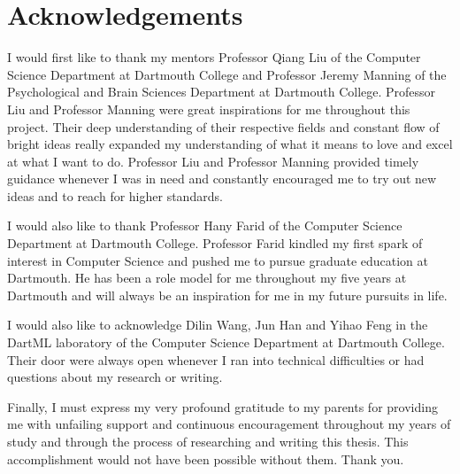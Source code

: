 \documentclass[12pt]{article}
\makeatletter
\renewcommand\listoffigures{%
    \section{\listfigurename}%
      \@mkboth{\MakeUppercase\listfigurename}%
              {\MakeUppercase\listfigurename}%
    \@starttoc{lof}%
    }
\makeatother
\begin{document}
\section{Acknowledgements}
I would first like to thank my mentors Professor Qiang Liu of the Computer Science Department at Dartmouth College and Professor Jeremy Manning of the Psychological and Brain Sciences Department at Dartmouth College. Professor Liu and Professor Manning were great inspirations for me throughout this project. Their deep understanding of their respective fields and constant flow of bright ideas really expanded my understanding of what it means to love and excel at what I want to do. Professor Liu and Professor Manning provided timely guidance whenever I was in need and constantly encouraged me to try out new ideas and to reach for higher standards. \par

I would also like to thank Professor Hany Farid of the Computer Science Department at Dartmouth College. Professor Farid kindled my first spark of interest in Computer Science and pushed me to pursue graduate education at Dartmouth. He has been a role model for me throughout my five years at Dartmouth and will always be an inspiration for me in my future pursuits in life.\par

I would also like to acknowledge Dilin Wang, Jun Han and Yihao Feng in the DartML laboratory of the Computer Science Department at Dartmouth College. Their door were always open whenever I ran into technical difficulties or had questions about my research or writing.\par

Finally, I must express my very profound gratitude to my parents for providing me with unfailing support and continuous encouragement throughout my years of study and through the process of researching and writing this thesis. This accomplishment would not have been possible without them. Thank you.\par
\newpage
\tableofcontents
\newpage
\listoffigures
\newpage






\end{document}
